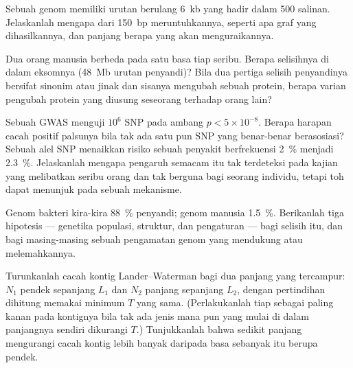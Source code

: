 \begin{exercise}[$\star\star$]\label{exo:b3:genomics:7}
Sebuah genom memiliki urutan berulang \qty{6}{kb} yang hadir dalam \num{500}
salinan. Jelaskanlah mengapa  dari  \qty{150}{bp} meruntuhkannya,
seperti apa graf yang dihasilkannya, dan panjang  berapa yang akan
menguraikannya.
\end{exercise}

\begin{exercise}[$\star\star$]\label{exo:b3:genomics:8}
Dua orang manusia berbeda pada satu basa tiap seribu. Berapa selisihnya di
dalam eksomnya (\qty{48}{Mb} urutan penyandi)? Bila dua pertiga selisih
penyandinya bersifat sinonim atau jinak dan sisanya mengubah sebuah protein,
berapa varian pengubah protein yang diusung seseorang terhadap
orang lain?
\end{exercise}

\begin{exercise}[$\star\star$]\label{exo:b3:genomics:9}
Sebuah GWAS menguji $10^{6}$ SNP pada ambang $p < 5\times 10^{-8}$. Berapa
harapan cacah positif palsunya bila tak ada satu pun SNP yang benar-benar
berasosiasi? Sebuah alel SNP menaikkan risiko sebuah penyakit berfrekuensi
\qty{2}{\%} menjadi \qty{2.3}{\%}. Jelaskanlah mengapa pengaruh semacam itu tak
terdeteksi pada kajian yang melibatkan seribu orang dan tak berguna bagi
seorang individu, tetapi toh dapat menunjuk pada sebuah mekanisme.
\end{exercise}

\begin{exercise}[$\star\star\star$]\label{exo:b3:genomics:10}
Genom bakteri kira-kira \qty{88}{\%} penyandi; genom manusia
\qty{1.5}{\%}. Berikanlah tiga hipotesis --- genetika populasi, struktur,
dan pengaturan --- bagi selisih itu, dan bagi masing-masing sebuah pengamatan
genom yang mendukung atau melemahkannya.
\end{exercise}

\begin{exercise}[$\star\star\star$]\label{exo:b3:genomics:11}
Turunkanlah cacah kontig Lander--Waterman bagi  dua panjang yang
tercampur: $N_{1}$  pendek sepanjang $L_{1}$ dan $N_{2}$  panjang
sepanjang $L_{2}$, dengan pertindihan dihitung memakai minimum $T$ yang sama.
(Perlakukanlah tiap  sebagai  paling kanan pada kontignya bila tak
ada  jenis mana pun yang mulai di dalam panjangnya sendiri dikurangi
$T$.) Tunjukkanlah bahwa sedikit  panjang mengurangi cacah kontig lebih
banyak daripada basa sebanyak itu berupa  pendek.
\end{exercise}

